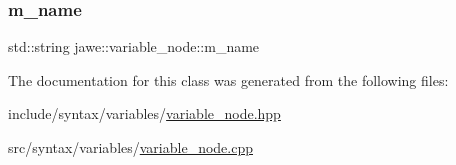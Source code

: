 \subsubsection{\texorpdfstring{m\+\_\+name}{m\_name}}
{\footnotesize\ttfamily std\+::string jawe\+::variable\+\_\+node\+::m\+\_\+name\hspace{0.3cm}{\ttfamily [private]}}



The documentation for this class was generated from the following files\+:\begin{DoxyCompactItemize}
\item 
include/syntax/variables/\hyperlink{variable__node_8hpp}{variable\+\_\+node.\+hpp}\item 
src/syntax/variables/\hyperlink{variable__node_8cpp}{variable\+\_\+node.\+cpp}\end{DoxyCompactItemize}
